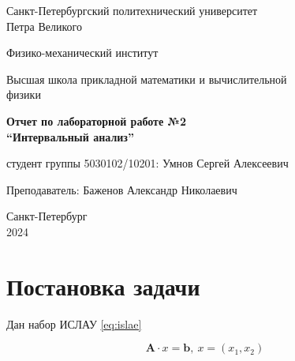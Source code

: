 \documentclass{article}
\begin{document}
  \begin{titlepage}
    \begin{center}
      Санкт-Петербургский политехнический университет \\Петра Великого
    \end{center}

    \begin{center}
      Физико-механический институт
    \end{center}

    \begin{center}
      Высшая школа прикладной математики и вычислительной\\ физики
    \end{center}

    \vspace{8em}

    \begin{center}
      \textbf{Отчет по лабораторной работе №2}\\
      \textbf{“Интервальный анализ”}
    \end{center}

    \vspace{\fill}

    \begin{flushright}
       студент группы 5030102/10201:
      \hfill
      Умнов Сергей Алексеевич \\
    \end{flushright}
    Преподаватель: \hfill Баженов Александр Николаевич

    \vspace{12em}

    \begin{center}
      Санкт-Петербург\\
      2024
    \end{center}
  \end{titlepage}

  \tableofcontents

  \newpage

  \section{Постановка задачи}

  Дан набор ИСЛАУ \ref{eq:islae}

  \begin{equation} \label{eq:islae}
    \mathbf{A} \cdot x = \mathbf{b}, \ x = (x_1, x_2)
  \end{equation}
\end{document}
